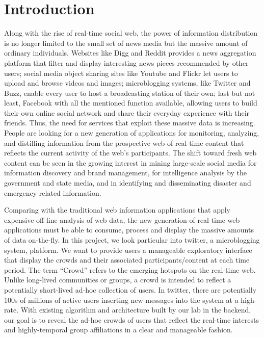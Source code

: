 \documentclass{sig-alternate}
\begin{document}
\section{Introduction}
Along with the rise of real-time social web, the power of information distribution is no longer limited to the small set of news media but the massive amount of ordinary individuals. Websites like Digg and Reddit provides a news aggregation platform that filter and display interesting news pieces recommended by other users; social media object sharing sites like Youtube and Flickr let users to upload and browse videos and images; microblogging systems, like Twitter and Buzz, enable every user to host a broadcasting station of their own; last but not least, Facebook with all the mentioned function available, allowing users to build their own online social network and share their everyday experience with their friends. Thus, the need for services that exploit these massive data is increasing. People are looking for a new generation of applications for monitoring, analyzing, and distilling information from the prospective web of real-time content that reflects the current activity of the web's participants. The shift toward fresh web content can be seen in the growing interest in mining large-scale social media for information discovery and brand management, for intelligence analysis by the government and state media, and in identifying and disseminating disaster and emergency-related information.

Comparing with the traditional web information applications that apply expensive off-line analysis of web data, the new generation of real-time web applications must be able to consume, process and display the massive amounts of data on-the-fly. In this project, we look particular into twitter, a microblogging system, platform. We want to provide users a manageable exploratory interface that display the crowds and their associated participants/content at each time period. The term ``Crowd'' refers to the emerging hotspots on the real-time web. Unlike long-lived communities or groups, a crowd is intended to reflect a potentially short-lived ad-hoc collection of users. In twitter, there are potentially 100s of millions of active users inserting new messages into the system at a high-rate. With existing algorithm and architecture built by our lab in the backend, our goal is to reveal the ad-hoc crowds of users that reflect the real-time interests and highly-temporal group affiliations in a clear and manageable fashion.
\end{document}
